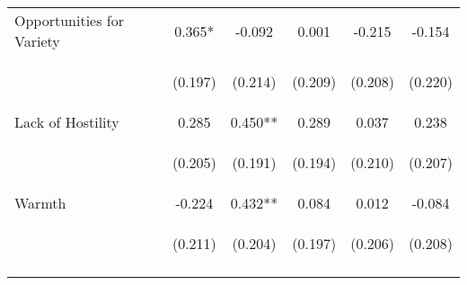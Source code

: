 \begin{tabular}{lccccc}
\noalign{\smallskip}Opportunities for Variety & 0.365* & -0.092 & 0.001 & -0.215 & -0.154\\
 & \begin{footnotesize}(0.197)\end{footnotesize} & \begin{footnotesize}(0.214)\end{footnotesize} & \begin{footnotesize}(0.209)\end{footnotesize} & \begin{footnotesize}(0.208)\end{footnotesize} & \begin{footnotesize}(0.220)\end{footnotesize}\\
\noalign{\smallskip}Lack of Hostility & 0.285 & 0.450** & 0.289 & 0.037 & 0.238\\
 & \begin{footnotesize}(0.205)\end{footnotesize} & \begin{footnotesize}(0.191)\end{footnotesize} & \begin{footnotesize}(0.194)\end{footnotesize} & \begin{footnotesize}(0.210)\end{footnotesize} & \begin{footnotesize}(0.207)\end{footnotesize}\\
\noalign{\smallskip}Warmth & -0.224 & 0.432** & 0.084 & 0.012 & -0.084\\
 & \begin{footnotesize}(0.211)\end{footnotesize} & \begin{footnotesize}(0.204)\end{footnotesize} & \begin{footnotesize}(0.197)\end{footnotesize} & \begin{footnotesize}(0.206)\end{footnotesize} & \begin{footnotesize}(0.208)\end{footnotesize}\\
\noalign{\smallskip}\hline\end{tabular}\\
